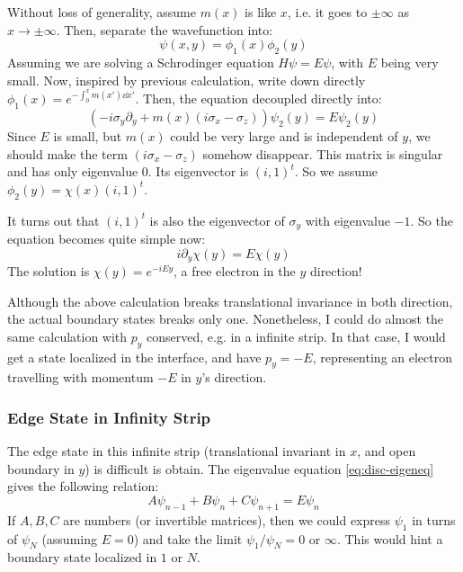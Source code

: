 \documentclass{article}
\begin{document}
    Without loss of generality, assume $m(x)$ is like $x$, i.e. it
    goes to $\pm\infty$ as $x\to\pm\infty$. Then, separate the
    wavefunction into:
    \begin{equation}
        \psi(x,y) = \phi_1(x)\phi_2(y)
    \end{equation}
    Assuming we are solving a Schrodinger equation $H\psi=E\psi$, with
    $E$ being very small.  Now, inspired by previous calculation,
    write down directly $\phi_1(x)=e^{-\int_0^x m(x')\dd{x'}}$.  Then,
    the equation decoupled directly into:
    \begin{equation}
        \left(
            -i\sigma_y\partial_y + m(x)\left(i\sigma_x-\sigma_z\right)
        \right)\psi_2(y) = E\psi_2(y)
    \end{equation}
    Since $E$ is small, but $m(x)$ could be very large and is
    independent of $y$, we should make the term $(i\sigma_x-\sigma_z)$
    somehow disappear. This matrix is singular and has only eigenvalue
    $0$. Its eigenvector is $(i,1)^t$. So we assume
    $\phi_2(y)=\chi(x)(i,1)^t$.
    
    It turns out that $(i,1)^t$ is also the eigenvector of
    $\sigma_y$ with eigenvalue $-1$. So the equation becomes quite
    simple now:
    \begin{equation}
        i\partial_y\chi(y) = E\chi(y)
    \end{equation}
    The solution is $\chi(y)=e^{-iEy}$, a free electron in the $y$
    direction!

    \begin{remark}
    Although the above calculation breaks translational invariance in both
    direction, the actual boundary states breaks only one. Nonetheless, I could
    do almost the same calculation with $p_y$ conserved, e.g. in a infinite
    strip. In that case, I would get a state localized in the interface, and
    have $p_y=-E$, representing an electron travelling with momentum $-E$ in
    $y$'s direction.
    \end{remark}

    \subsubsection{Edge State in Infinity Strip}
    The edge state in this infinite strip (translational invariant in $x$, and
    open boundary in $y$) is difficult is obtain. The eigenvalue equation
    \ref{eq:disc-eigeneq} gives the following relation:
    \begin{equation}
        \label{eq:rec-disc-eigeneq}
        A \psi_{n-1} + B\psi_n + C\psi_{n+1} = E\psi_n
    \end{equation}
    If $A,B,C$ are numbers (or invertible matrices), then we could express
    $\psi_1$ in turns of $\psi_N$ (assuming $E=0$) and take the limit
    $\psi_1/\psi_N=0$ or $\infty$. This would hint a boundary state localized in
    $1$ or $N$.
\end{document}
